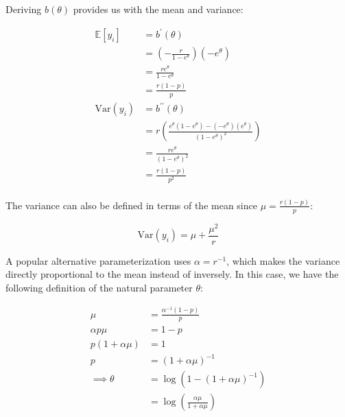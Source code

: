 \documentclass{report}
\begin{document}
Deriving $b(\theta)$ provides us with the mean and variance:

\begin{equation}\label{eq:ex-glm-nb-dist-mean-var}
    \begin{aligned}
        \mathbb{E}[y_i]
          &= b^\prime(\theta) \\
          &= \left(-\frac{r}{1-e^\theta}\right)\left(-e^\theta\right) \\
          &= \frac{re^\theta}{1-e^\theta} \\
          &= \frac{r(1-p)}{p} \\
        \text{Var}(y_i)
          &= b^{\prime\prime}(\theta) \\
          &= r\left(\frac{e^\theta\left(1-e^\theta\right) - \left(-e^\theta\right)\left(e^\theta\right)}{\left(1-e^\theta\right)^2}\right) \\
          &= \frac{re^\theta}{\left(1-e^\theta\right)^2} \\
          &= \frac{r(1-p)}{p^2} \\
    \end{aligned}
\end{equation}

The variance can also be defined in terms of the mean since $\mu = \frac{r(1-p)}{p}$:

\begin{equation}\label{eq:ex-glm-nb-dist-variance-by-mean}
    \text{Var}(y_i) = \mu + \frac{\mu^2}{r}
\end{equation}

A popular alternative parameterization uses $\alpha = r^{-1}$, which makes the variance directly proportional to the mean instead of inversely. In this case, we have the following definition of the natural parameter $\theta$:

\begin{equation}\label{eq:ex-glm-nb-dist-alpha-parameterization}
    \begin{aligned}
      \mu &= \frac{\alpha^{-1}(1-p)}{p} \\
      \alpha p \mu &= 1 - p \\
      p(1+\alpha\mu) &= 1 \\
      p &= (1 + \alpha\mu)^{-1} \\
      \implies \theta 
        &= \log\left(1 - (1+\alpha\mu)^{-1}\right) \\
        &= \log\left(\frac{\alpha\mu}{1+\alpha\mu}\right) \\
    \end{aligned}
\end{equation}
\end{document}
